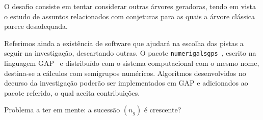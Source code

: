 \documentclass[12pt,a4paper]{article}
\numberwithin{table}{section}
\numberwithin{figure}{section}
\numberwithin{equation}{section}
\theoremstyle{definition}
\theoremstyle{remark}
\begin{document}
O desafio consiste em tentar considerar outras árvores geradoras, tendo em vista o estudo de assuntos relacionados com conjeturas para as quais a árvore clássica parece desadequada.

Referimos ainda a existência de software que ajudará na escolha das pistas a seguir na investigação, descartando outras. O pacote \texttt{numerigalsgps}~\cite{NumericalSgps1.4.0}, escrito na linguagem GAP~\cite{GAP4.14.0} e distribuído com o sistema computacional com o mesmo nome, destina-se a cálculos com semigrupos numéricos. Algoritmos desenvolvidos no decurso da investigação poderão ser implementados em GAP e adicionados ao pacote referido, o qual aceita contribuições.

Problema a ter em mente: a sucessão \(\left(n_g\right)\) é crescente?


\printbibliography
% 
%
\end{document}
